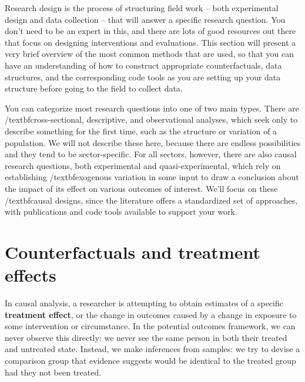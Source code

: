 
\begin{fullwidth}
Research design is the process of structuring field work
-- both experimental design and data collection --
that will answer a specific research question.
You don't need to be an expert in this,
and there are lots of good resources out there
that focus on designing interventions and evaluations.
This section will present a very brief overview
of the most common methods that are used,
so that you can have an understanding of
how to construct appropriate counterfactuals,
data structures, and the corresponding code tools
as you are setting up your data structure
before going to the field to collect data.

You can categorize most research questions into one of two main types.
There are /textbf{cross-sectional}, descriptive, and observational analyses,
which seek only to describe something for the first time,
such as the structure or variation of a population.
We will not describe these here,
because there are endless possibilities
and they tend to be sector-specific.
For all sectors, however, there are also causal research questions,
both experimental and quasi-experimental,
which rely on establishing /textbf{exogenous variation} in some input
to draw a conclusion about the impact of its effect
on various outcomes of interest.
We'll focus on these /textbf{causal designs}, since the literature
offers a standardized set of approaches, with publications
and code tools available to support your work.
\end{fullwidth}


\section{Counterfactuals and treatment effects}

In causal analysis, a researcher is attempting to obtain estimates
of a specific \textbf{treatment effect}, or the change in outcomes
caused by a change in exposure to some intervention or circumstance.\cite{abadie2018econometric}
In the potential outcomes framework,
we can never observe this directly:
we never see the same person in both their treated and untreated state.
Instead, we make inferences from samples:
we try to devise a comparison group that evidence suggests
would be identical to the treated group had they not been treated.


